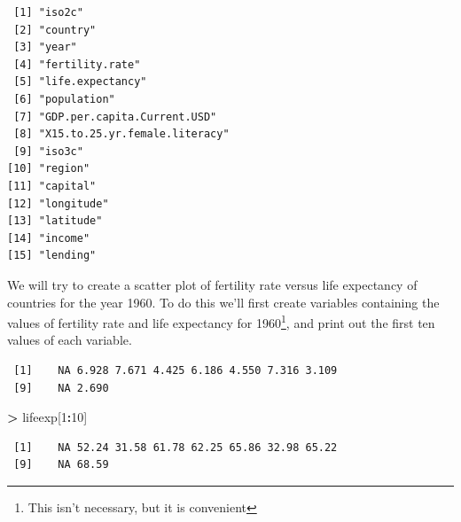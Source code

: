 \documentclass[]{krantz}
\makeatletter
\newenvironment{Shaded}{\begin{snugshade}}{\end{snugshade}}
\newcommand{\DecValTok}[1]{\textcolor[rgb]{0.06,0.06,0.06}{#1}}
\newcommand{\StringTok}[1]{\textcolor[rgb]{0.5,0.5,0.5}{#1}}
\newcommand{\OperatorTok}[1]{\textcolor[rgb]{0.43,0.43,0.43}{\textbf{#1}}}
\newcommand{\NormalTok}[1]{#1}
\newenvironment{kframe}{%
\medskip{}
\setlength{\fboxsep}{.8em}
 \def\at@end@of@kframe{}%
 \ifinner\ifhmode%
  \def\at@end@of@kframe{\end{minipage}}%
  \begin{minipage}{\columnwidth}%
 \fi\fi%
 \def\FrameCommand##1{\hskip\@totalleftmargin \hskip-\fboxsep
 \colorbox{shadecolor}{##1}\hskip-\fboxsep
     \hskip-\linewidth \hskip-\@totalleftmargin \hskip\columnwidth}%
 \MakeFramed {\advance\hsize-\width
   \@totalleftmargin\z@ \linewidth\hsize
   \@setminipage}}%
 {\par\unskip\endMakeFramed%
 \at@end@of@kframe}
\renewenvironment{Shaded}{\begin{kframe}}{\end{kframe}}
\makeatother
\begin{document}
\begin{verbatim}
 [1] "iso2c"                       
 [2] "country"                     
 [3] "year"                        
 [4] "fertility.rate"              
 [5] "life.expectancy"             
 [6] "population"                  
 [7] "GDP.per.capita.Current.USD"  
 [8] "X15.to.25.yr.female.literacy"
 [9] "iso3c"                       
[10] "region"                      
[11] "capital"                     
[12] "longitude"                   
[13] "latitude"                    
[14] "income"                      
[15] "lending"                     
\end{verbatim}

We will try to create a scatter plot of fertility rate versus life
expectancy of countries for the year 1960. To do this we'll first create
variables containing the values of fertility rate and life expectancy
for 1960\footnote{This isn't necessary, but it is convenient}, and print
out the first ten values of each variable.

\begin{Shaded}
\end{Shaded}

\begin{verbatim}
 [1]    NA 6.928 7.671 4.425 6.186 4.550 7.316 3.109
 [9]    NA 2.690
\end{verbatim}

\begin{Shaded}
\begin{Highlighting}[]
\OperatorTok{>}\StringTok{ }\NormalTok{lifeexp[}\DecValTok{1}\OperatorTok{:}\DecValTok{10}\NormalTok{]}
\end{Highlighting}
\end{Shaded}

\begin{verbatim}
 [1]    NA 52.24 31.58 61.78 62.25 65.86 32.98 65.22
 [9]    NA 68.59
\end{verbatim}
\end{document}
